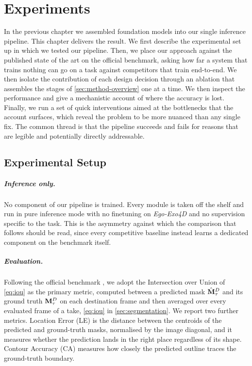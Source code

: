 \chapter{Experiments}
\label{chap:experiments}

In the previous chapter we assembled foundation models into our single inference pipeline. This chapter delivers the result. We first describe the experimental set up in which we tested our pipeline. Then, we place our approach against the published state of the art on the official benchmark, asking how far a system that trains nothing can go on a task against competitors that train end-to-end. We then isolate the contribution of each design decision through an ablation that assembles the stages of \cref{sec:method-overview} one at a time. We then inspect the performance and give a mechanistic account of where the accuracy is lost. Finally, we run a set of quick interventions aimed at the bottlenecks that the account surfaces, which reveal the problem to be more nuanced than any single fix. The common thread is that the pipeline succeeds and fails for reasons that are legible and potentially directly addressable.

\section{Experimental Setup}
\label{sec:setup}

\paragraph{Inference only.}
No component of our pipeline is trained. Every module is taken off the shelf and run in pure inference mode with no finetuning on \textit{Ego-Exo4D} and no supervision specific to the task. This is the asymmetry against which the comparison that follows should be read, since every competitive baseline instead learns a dedicated component on the benchmark itself.

\paragraph{Evaluation.}
Following the official benchmark \cite{grauman2024egoexo4d}, we adopt the Intersection over Union of \cref{eq:iou} as the primary metric, computed between a predicted mask $\hat{\mathbf{M}}^D_\tau$ and its ground truth $\mathbf{M}^D_\tau$ on each destination frame and then averaged over every evaluated frame of a take, \cref{eq:iou} in \cref{sec:segmentation}. We report two further metrics. Location Error (LE) is the distance between the centroids of the predicted and ground-truth masks, normalised by the image diagonal, and it measures whether the prediction lands in the right place regardless of its shape. Contour Accuracy (CA) \cite{perazzi2016benchmark} measures how closely the predicted outline traces the ground-truth boundary.

